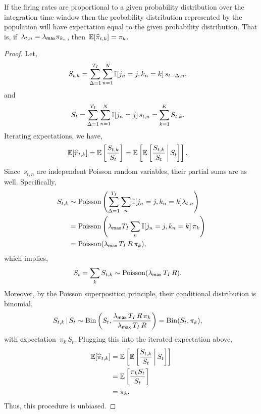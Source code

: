 \begin{lemma}
\label{lem:consistency}
If the firing rates are proportional to a given probability
distribution over the integration time window then the probability
distribution represented by the population will have expectation equal
to the given probability distribution.  That is,
if~$\lambda_{t, n}=\lambda_{\mathsf{max}} \pi_{k_n}$,
then~$\mathbb{E}[\widehat{\pi}_{t,k}] = \pi_{k}$.
\end{lemma}

\begin{proof}
  Let,
  \begin{align*}
    S_{t,k} &= \sum_{\Delta = 1}^{T_I} \sum_{n=1}^N \mathbb{I}[j_n=j, k_n=k] \, s_{t-\Delta,n},
  \end{align*}
  and
  \begin{align*}
    S_{t} &= \sum_{\Delta = 1}^{T_I} \sum_{n=1}^N \mathbb{I}[j_n=j] \,  s_{t,n} = \sum_{k=1}^K S_{t,k}.
  \end{align*}
  Iterating expectations, we have,
  \begin{align*}
    \mathbb{E}[\widehat{\pi}_{t,k}] &=
    \mathbb{E} \left[ \frac{S_{t, k}}{S_{t}} \right]
    = \mathbb{E} \left[
      \mathbb{E} \left[
        \frac{S_{t,k}}{S_t} \, \bigg|\, S_{t}  
      \right] \right].
  \end{align*}
  Since~$s_{t, n}$ are independent Poisson random variables, their partial
  sums are as well.  Specifically,
  \begin{align}
    \nonumber
    S_{t,k} &\sim \mathrm{Poisson} \left( \sum_{\Delta = 1}^{T_I} \sum_{n} \mathbb{I}[j_n=j, k_n=k] \lambda_{t,n} \right) \\
    \nonumber
    &= \mathrm{Poisson} \left(\lambda_{\mathsf{max}} T_I \sum_n \mathbb{I}[j_n=j, k_n=k] \, \pi_{k} \right) \\
    \label{eq:S_t_rate}
    &= \mathrm{Poisson}(\lambda_{\mathsf{max}} \, T_I \, R \, \pi_{k}),
  \end{align}
  which implies,
  \begin{align*}
    S_{t} = \sum_{k} S_{t,k} &\sim \mathrm{Poisson}(\lambda_{\mathsf{max}} \, T_I \, R).
  \end{align*}
  Moreover, by the Poisson superposition principle, their conditional
  distribution is binomial,
  \begin{align*}
    S_{t,k} \,|\, S_t &\sim
    \mathrm{Bin} \left( S_t, \frac{\lambda_{\mathsf{max}} \, T_I \, R \, \pi_{k}}{\lambda_{\mathsf{max}} \, T_I \, R} \right)
    =\mathrm{Bin}(S_t, \pi_{k}),
  \end{align*}
  with expectation~$\pi_{k} \, S_t$.
  Plugging this into the iterated expectation above, 
  \begin{align*}
    \mathbb{E}[\widehat{\pi}_{t,k}]
    &= \mathbb{E} \left[
      \mathbb{E} \left[
        \frac{S_{t,k}}{S_t} \, \bigg|\, S_t  \right] \right] \\
    &= \mathbb{E} \left[ 
      \frac{\pi_{k} S_t}{S_t} \right]\\
    &= \pi_{k}.
  \end{align*}
  Thus, this procedure is unbiased.
\end{proof}


